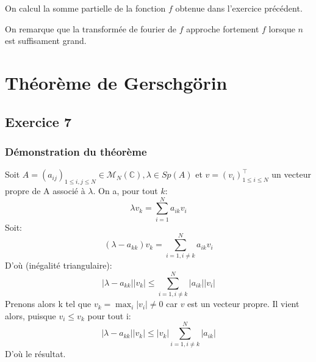 \documentclass[a4paper,12pt]{article}
\begin{document}
On calcul la somme partielle de la fonction $f$ obtenue dans l'exercice précédent. 

\begin{figure}[h]
    \centering
    \hspace{0mm}
\end{figure}

On remarque que la transformée de fourier de $f$ approche fortement $f$ lorsque $n$ est suffisament grand.

\section{ Théorème de Gerschgörin}

\subsection{ Exercice 7}
\subsubsection{Démonstration du théorème}
Soit $A = (a_{ij})_{1 \leqslant i, j \leqslant N} \in \mathcal{M}_N(\mathbb{C}),
\lambda \in Sp(A)$  et $ v = (v_i)_{1 \leqslant i \leqslant N}^\intercal$ un vecteur propre de A
 associé à $\lambda$.
 On a, pour tout $k$:
 \begin{equation}
     \lambda v_k = \sum\limits_{i=1}^N a_{ik}v_i
 \end{equation}
 Soit:
 \begin{equation}
     (\lambda - a_{kk})v_k = \sum\limits_{i=1, i \neq k}^N a_{ik}v_i
 \end{equation}
 D'où (inégalité triangulaire):
 \begin{equation}
    |\lambda - a_{kk}||v_k| \leqslant \sum\limits_{i=1, i \neq k}^N |a_{ik}||v_i|
 \end{equation}
 Prenons alors k tel que $v_k = \max_{i} |v_i| \neq 0$ car $v$ est un vecteur propre.
 Il vient alors, puisque $v_i \leqslant v_k$ pour tout i:
 \begin{equation}
     |\lambda - a_{kk}||v_k| \leqslant |v_k|\sum\limits_{i=1, i \neq k}^N |a_{ik}|
 \end{equation}
D'où le résultat.
\end{document}
